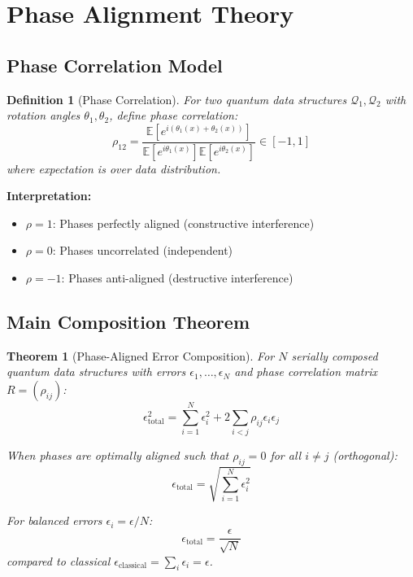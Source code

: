 \documentclass[11pt]{article}
\newtheorem{theorem}{Theorem}
\newtheorem{definition}{Definition}
\begin{document}
\section{Phase Alignment Theory}
\label{sec:phase_alignment}

\subsection{Phase Correlation Model}

\begin{definition}[Phase Correlation]
For two quantum data structures $\mathcal{Q}_1, \mathcal{Q}_2$ with rotation angles $\theta_1, \theta_2$, define phase correlation:
\begin{equation}
\rho_{12} = \frac{\mathbb{E}[e^{i(\theta_1(x) + \theta_2(x))}]}{\mathbb{E}[e^{i\theta_1(x)}] \mathbb{E}[e^{i\theta_2(x)}]} \in [-1, 1]
\end{equation}
where expectation is over data distribution.
\end{definition}

\textbf{Interpretation:}
\begin{itemize}
\item $\rho = 1$: Phases perfectly aligned (constructive interference)
\item $\rho = 0$: Phases uncorrelated (independent)
\item $\rho = -1$: Phases anti-aligned (destructive interference)
\end{itemize}

\subsection{Main Composition Theorem}

\begin{theorem}[Phase-Aligned Error Composition]
\label{thm:phase_aligned_composition}
For $N$ serially composed quantum data structures with errors $\epsilon_1, \ldots, \epsilon_N$ and phase correlation matrix $R = (\rho_{ij})$:
\begin{equation}
\epsilon_{\text{total}}^2 = \sum_{i=1}^N \epsilon_i^2 + 2\sum_{i<j} \rho_{ij} \epsilon_i \epsilon_j
\end{equation}

When phases are optimally aligned such that $\rho_{ij} = 0$ for all $i \neq j$ (orthogonal):
\begin{equation}
\epsilon_{\text{total}} = \sqrt{\sum_{i=1}^N \epsilon_i^2}
\end{equation}

For balanced errors $\epsilon_i = \epsilon/N$:
\begin{equation}
\epsilon_{\text{total}} = \frac{\epsilon}{\sqrt{N}}
\end{equation}
compared to classical $\epsilon_{\text{classical}} = \sum_i \epsilon_i = \epsilon$.
\end{theorem}
\end{document}
